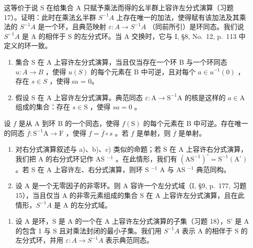 这等价于说 S 在给集合 A 只赋予乘法而得的幺半群上容许左分式演算（习题 17）。证明：此时在乘法幺半群 \(S^{-1}A\) 上存在唯一的加法，使得赋有该加法及其乘法的 \(S^{-1}A\) 是一个环，且典范映射 \(\varepsilon: A \to S^{-1}A\) （同前所引）是环同态。我们说 \(S^{-1}A\) 是 A 的相伴于 S 的左分式环。当 A 交换时，它与 I, §8, No.~12, p.~113 中定义的环一致。

\begin{enumerate}
\def\labelenumi{\alph{enumi})}
\setcounter{enumi}{1}
\item
  集合 S 在 A 上容许左分式演算，当且仅当存在一个环 B 与一个环同态 \(u: A \to B\) ，使得 \(u(S)\) 的每个元素在 B 中可逆，且对每个 \(a \in u^{-1}(0)\) ，存在 \(s \in S\) ，使得 sa = 0。
\item
  假设 S 在 A 上容许左分式演算。典范同态 \(\varepsilon : \mathrm{A} \to \mathrm{S}^{-1}\mathrm{A}\) 的核是这样的 \(a \in \mathrm{A}\) 组成的集合：存在 \(s \in \mathrm{S}\) ，使得 \(sa = 0\) 。
\end{enumerate}

设 \(f\) 是从 A 到环 B 的一个同态，使得 \(f(\mathrm{S})\) 的每个元素在 B 中可逆。存在唯一的同态 \(\overline{f} : \mathrm{S}^{-1}\mathrm{A} \to \mathrm{F}\) ，使得 \(f = \overline{f} \circ s\) 。若 \(f\) 是单射，则 \(\overline{f}\) 是单射。

\begin{enumerate}
\def\labelenumi{\alph{enumi})}
\setcounter{enumi}{3}
\item
  对右分式演算叙述与 a)、b)、c) 类似的命题；若 S 在 A 上容许右分式演算，我们把 A 的右分式环记作 AS \(^{-1}\) 。在此情形，我们有 \((\mathrm{AS}^{-1})^{\circ} = \mathrm{S}^{-1}(\mathrm{A}^{\circ})\) 。若 S 在 A 上容许左、右分式演算，则环 S \(^{-1}\) A 与 AS \(^{-1}\) 典范同构。
\item
  设 A 是一个无零因子的非零环。则 A 容许一个左分式域（I, §9, p.~177, 习题 15），当且仅当 A 的非零元素组成的集合 S 在 A 上容许左分式演算，且在此情形，\(S^{-1}A\) 是 A 的左分式域。
\end{enumerate}

\begin{enumerate}
\def\labelenumi{\arabic{enumi})}
\setcounter{enumi}{18}
\tightlist
\item
  设 A 是环，S 是 A 的一个在 A 上容许左分式演算的子集（习题 18），S' 是 A 的包含 1 与 S 且对乘法封闭的最小子集。我们用 \(S^{-1}A\) 表示 A 的相伴于 S 的左分式环，并用 \(\varepsilon:A\to S^{-1}A\) 表示典范同态。
\end{enumerate}

